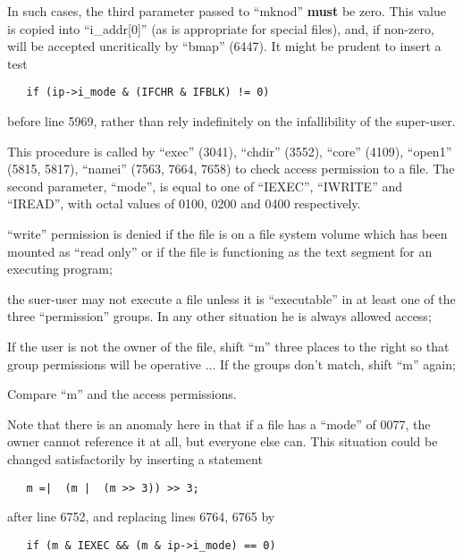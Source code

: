 In  such  cases,  the  third  parameter
passed  to  ``mknod'' {\bf must} be zero.  This
value is copied into ``i\_addr[0]'' (as is
appropriate for special files), and, if
non-zero, will be accepted uncritically
by  ``bmap''  (6447). It might be prudent
to insert a test

\begin{verbatim}
   if (ip->i_mode & (IFCHR & IFBLK) != 0)
\end{verbatim}

\noindent before  line  5969,  rather  than  rely
indefinitely  on  the  infallibility of
the super-user.



This  procedure  is  called  by  ``exec''
(3041),  ``chdir'' (3552), ``core'' (4109),
``open1'' (5815,  5817),  ``namei''  (7563,
7664,  7658) to check access permission
to  a  file.  The   second   parameter,
``mode'',  is  equal  to  one of ``IEXEC'',
``IWRITE'' and ``IREAD'', with octal values
of 0100, 0200 and 0400 respectively.

\bd
\item[6753:] ``write'' permission is  denied  if
      the  file  is  on  a  file system
      volume which has been mounted  as
      ``read  only''  or  if  the file is
      functioning as the  text  segment
      for an executing program;

\item[6763:] the suer-user may not execute  a
file unless it is ``executable'' in
at least one of the  three  ``permission''  groups.  In  any  other
situation he  is  always  allowed
access;

\item[6769:] If the user is not the  owner  of
      the  file, shift ``m'' three places
      to the right so that  group  permissions will be operative ... If
      the groups don't match, shift ``m''
      again;

\item[6774:] Compare ``m'' and the  access  permissions.
\ed


Note that there is an anomaly  here  in
that  if  a  file has a ``mode'' of 0077,
the owner cannot reference it  at  all,
but  everyone  else can. This situation
could  be  changed  satisfactorily   by
inserting a statement

\begin{verbatim}
   m =|  (m |  (m >> 3)) >> 3;
\end{verbatim}

\noindent after line 6752,  and  replacing  lines
6764, 6765 by

\begin{verbatim}
   if (m & IEXEC && (m & ip->i_mode) == 0)
\end{verbatim}
